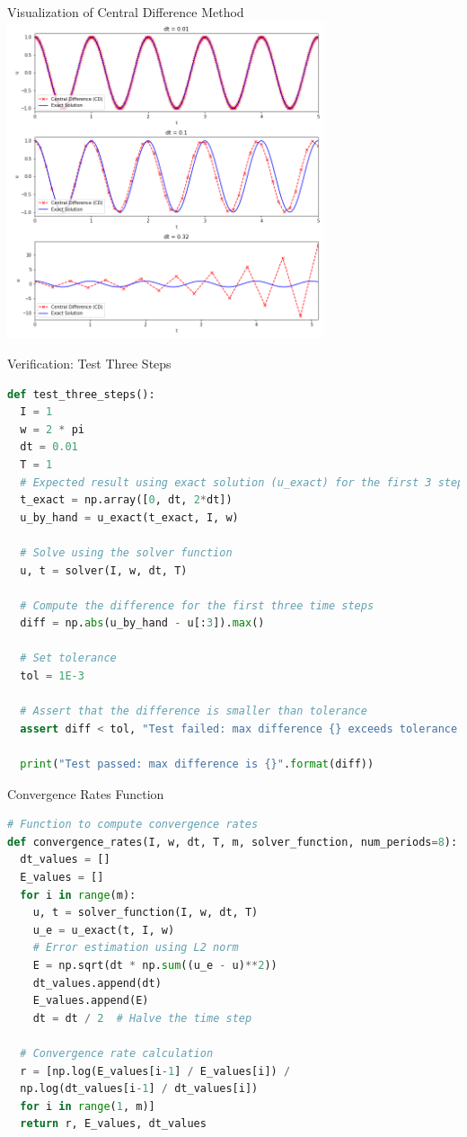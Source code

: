 \documentclass[10pt, aspectratio=54]{beamer}
\begin{document}
	
\begin{frame}{Visualization of Central Difference Method}
	\centering
	\includegraphics[width=0.7\textwidth]{Figures/CD_vib.png} %
\end{frame}


\begin{frame}[fragile]{Verification: Test Three Steps}
	
	\begin{lstlisting}[language=Python]
def test_three_steps():
  I = 1
  w = 2 * pi
  dt = 0.01
  T = 1
  # Expected result using exact solution (u_exact) for the first 3 steps
  t_exact = np.array([0, dt, 2*dt])
  u_by_hand = u_exact(t_exact, I, w)
	
  # Solve using the solver function
  u, t = solver(I, w, dt, T)
	
  # Compute the difference for the first three time steps
  diff = np.abs(u_by_hand - u[:3]).max()
	
  # Set tolerance
  tol = 1E-3
	
  # Assert that the difference is smaller than tolerance
  assert diff < tol, "Test failed: max difference {} exceeds tolerance {}".format(diff, tol)
	
  print("Test passed: max difference is {}".format(diff))
	\end{lstlisting}
\end{frame}

\begin{frame}[fragile]{Convergence Rates Function}
	
	\begin{lstlisting}[language=Python]
# Function to compute convergence rates
def convergence_rates(I, w, dt, T, m, solver_function, num_periods=8):
  dt_values = []
  E_values = []
  for i in range(m):
    u, t = solver_function(I, w, dt, T)
    u_e = u_exact(t, I, w)
    # Error estimation using L2 norm
    E = np.sqrt(dt * np.sum((u_e - u)**2))
    dt_values.append(dt)
    E_values.append(E)
    dt = dt / 2  # Halve the time step

  # Convergence rate calculation
  r = [np.log(E_values[i-1] / E_values[i]) /
  np.log(dt_values[i-1] / dt_values[i])
  for i in range(1, m)]
  return r, E_values, dt_values

	\end{lstlisting}
\end{frame}
\end{document}
